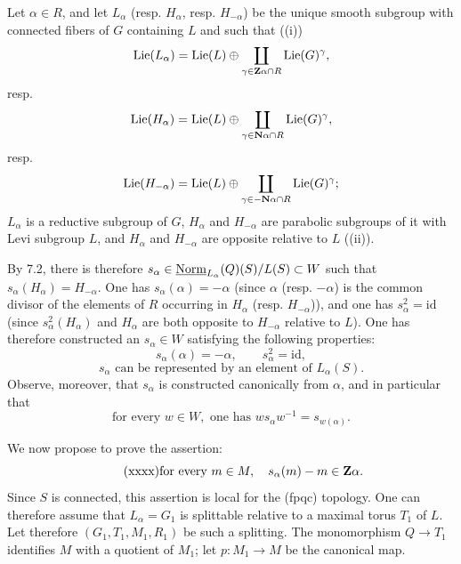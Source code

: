 \label{XXVI.7.4.2}
Let $\alpha\in R$, and let $L_\alpha$ (resp. $H_\alpha$, resp. $H_{-\alpha}$) be the unique smooth subgroup with connected fibers of $G$ containing $L$ and such that ((i))
\[
 \operatorname{Lie}(L_\alpha)=\operatorname{Lie}(L)\oplus\coprod_{\gamma\in\mathbf{Z}\alpha\cap R}\operatorname{Lie}(G)^\gamma,
\]
resp.
\[
 \operatorname{Lie}(H_\alpha)=\operatorname{Lie}(L)\oplus\coprod_{\gamma\in\mathbf{N}\alpha\cap R}\operatorname{Lie}(G)^\gamma,
\]
resp.
\[
 \operatorname{Lie}(H_{-\alpha})=\operatorname{Lie}(L)\oplus\coprod_{\gamma\in-\mathbf{N}\alpha\cap R}\operatorname{Lie}(G)^\gamma;
\]
$L_\alpha$ is a reductive subgroup of $G$, $H_\alpha$ and $H_{-\alpha}$ are parabolic subgroups of it with Levi subgroup $L$, and $H_\alpha$ and $H_{-\alpha}$ are opposite relative to $L$ ((ii)).

By 7.2, there is therefore $s_\alpha\in\underline{\mathrm{Norm}}_{L_\alpha}(Q)(S)/L(S)\subset W$ such that $s_\alpha(H_\alpha)=H_{-\alpha}$. One has $s_\alpha(\alpha)=-\alpha$ (since $\alpha$ (resp. $-\alpha$) is the common divisor of the elements of $R$ occurring in $H_\alpha$ (resp. $H_{-\alpha}$)), and one has $s_\alpha^2=\mathrm{id}$ (since $s_\alpha^2(H_\alpha)$ and $H_\alpha$ are both opposite to $H_{-\alpha}$ relative to $L$). One has therefore constructed an $s_\alpha\in W$ satisfying the following properties:
\begin{equation}\tag{x}
 s_\alpha(\alpha)=-\alpha,\qquad s_\alpha^2=\mathrm{id},
\end{equation}
\begin{equation}\tag{xx}
 s_\alpha\text{ can be represented by an element of }L_\alpha(S).
\end{equation}
Observe, moreover, that $s_\alpha$ is constructed canonically from $\alpha$, and in particular that
\begin{equation}\tag{xxx}
 \text{for every }w\in W,\text{ one has }ws_\alpha w^{-1}=s_{w(\alpha)}.
\end{equation}

\label{XXVI.7.4.3}
We now propose to prove the assertion:
\begin{equation}\tag{xxxx}
 \text{for every }m\in M,\quad s_\alpha(m)-m\in\mathbf{Z}\alpha.
\end{equation}
Since $S$ is connected, this assertion is local for the (fpqc) topology. One can therefore assume that $L_\alpha=G_1$ is splittable relative to a maximal torus $T_1$ of $L$. Let therefore $(G_1,T_1,M_1,R_1)$ be such a splitting. The monomorphism $Q\to T_1$ identifies $M$ with a quotient of $M_1$; let $p:M_1\to M$ be the canonical map.

